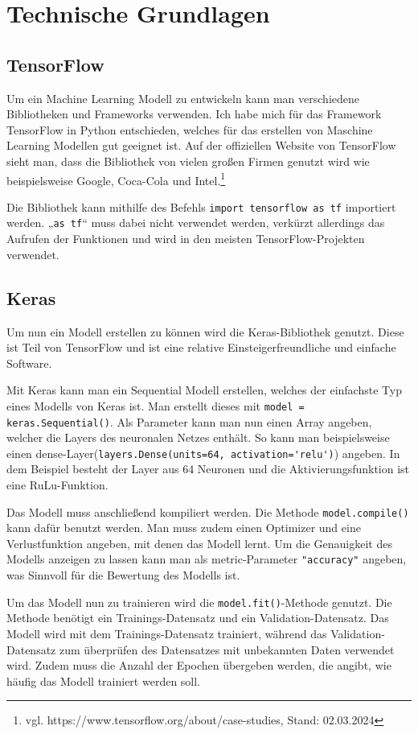 \documentclass[11pt,oneside]{report}
\begin{document}
\chapter{Technische Grundlagen}

\section{TensorFlow}
Um ein Machine Learning Modell zu entwickeln kann man verschiedene Bibliotheken und Frameworks verwenden. Ich habe mich für das Framework TensorFlow in Python entschieden, welches für das erstellen von Maschine Learning Modellen gut geeignet ist. Auf der offiziellen Website von TensorFlow sieht man, dass die Bibliothek von vielen großen Firmen genutzt wird wie beispielsweise Google, Coca-Cola und Intel.\footnote{vgl. https://www.tensorflow.org/about/case-studies, Stand: 02.03.2024}

Die Bibliothek kann mithilfe des Befehls \verb+import tensorflow as tf+ importiert werden. „\verb+as tf+“ muss dabei nicht verwendet werden, verkürzt allerdings das Aufrufen der Funktionen und wird in den meisten TensorFlow-Projekten verwendet.

\section{Keras}
Um nun ein Modell erstellen zu können wird die Keras-Bibliothek genutzt. Diese ist Teil von TensorFlow und ist eine relative Einsteigerfreundliche und einfache Software.

Mit Keras kann man ein Sequential Modell erstellen, welches der einfachste Typ eines Modells von Keras ist. Man erstellt dieses mit \verb+model = keras.Sequential()+. Als Parameter kann man nun einen Array angeben, welcher die Layers des neuronalen Netzes enthält. So kann man beispielsweise einen dense-Layer(\verb+layers.Dense(units=64, activation='relu')+) angeben. In dem Beispiel besteht der Layer aus 64 Neuronen und die Aktivierungsfunktion ist eine RuLu-Funktion.

Das Modell muss anschließend kompiliert werden. Die Methode \verb+model.compile()+ kann dafür benutzt werden. Man muss zudem einen Optimizer und eine Verlustfunktion angeben, mit denen das Modell lernt. Um die Genauigkeit des Modells anzeigen zu lassen kann man als metric-Parameter \verb+"accuracy"+ angeben, was Sinnvoll für die Bewertung des Modells ist.

Um das Modell nun zu trainieren wird die \verb+model.fit()+-Methode genutzt. Die Methode benötigt ein Trainings-Datensatz und ein Validation-Datensatz. Das Modell wird mit dem Trainings-Datensatz trainiert, während das Validation-Datensatz zum überprüfen des Datensatzes mit unbekannten Daten verwendet wird. Zudem muss die Anzahl der Epochen übergeben werden, die angibt, wie häufig das Modell trainiert werden soll.
\end{document}
